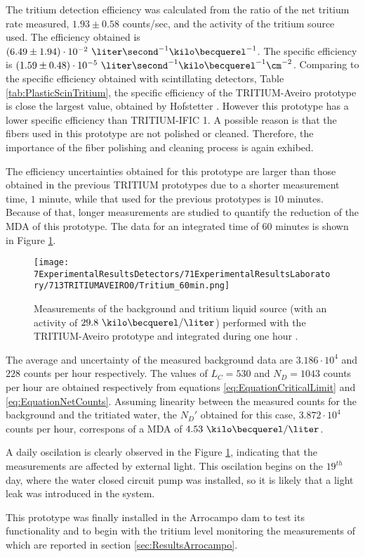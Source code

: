 The tritium detection efficiency was calculated from the ratio of the net tritium rate measured, $1.93 \pm 0.58$ counts/sec, and the activity of the tritium source used. The efficiency obtained is $(6.49 \pm 1.94)\cdot{} 10^{-2}~\liter\second^{-1}\kilo\becquerel^{-1}$.  The specific efficiency is $(1.59 \pm 0.48)\cdot{} 10^{-5}~\liter\second^{-1}\kilo\becquerel^{-1}\cm^{-2}$. Comparing to the specific efficiency obtained with scintillating detectors, Table \ref{tab:PlasticScinTritium}, the specific efficiency of the TRITIUM-Aveiro prototype is close the largest value, obtained by Hofstetter \cite{Hofstetter1, Hofstetter2}. However this prototype has a lower specific efficiency than TRITIUM-IFIC 1. A possible reason is that the fibers used in this prototype are not polished or cleaned. Therefore, the importance of the fiber polishing and cleaning process is again exhibed.

The efficiency uncertainties obtained for this prototype are larger than those obtained in the previous TRITIUM prototypes due to a shorter measurement time, $1$ minute, while that used for the previous prototypes is $10$ minutes. Because of that, longer measurements are studied to quantify the reduction of the MDA of this prototype. The data for an integrated time of $60$ minutes is shown in Figure \ref{fig:Tritium60min}.

\begin{figure}[h]
\centering
\texttt{[image: 7ExperimentalResultsDetectors/71ExperimentalResultsLaboratory/713TRITIUMAVEIRO0/Tritium\_60min.png]}
\caption{Measurements of the background and tritium liquid source (with an activity of $29.8~\kilo\becquerel/\liter$) performed with the TRITIUM-Aveiro prototype and integrated during one hour \cite{ExperimentalPaperCarlos}.\label{fig:Tritium60min}}
\end{figure}

The average and uncertainty of the measured background data are $3.186 \cdot{} 10^{4}$ and $228$ counts per hour respectively. The values of $L_C=530$ and $N_D=1043$ counts per hour are obtained respectively from equations \ref{eq:EquationCriticalLimit} and \ref{eq:EquationNetCounts}. Assuming linearity between the measured counts for the background and the tritiated water, the $N_D'$ obtained for this case, $3.872\cdot{}10^4$ counts per hour,  correspons of a MDA of $4.53~\kilo\becquerel/\liter$.

A daily oscilation is clearly observed in the Figure \ref{fig:Tritium60min}, indicating that the measurements are affected by external light. This oscilation begins on the $19^{th}$ day, where the water closed circuit pump was installed, so it is likely that a light leak was introduced in the system.

This prototype was finally installed in the Arrocampo dam to test its functionality and to begin with the tritium level monitoring the measurements of which are reported in section \ref{sec:ResultsArrocampo}.